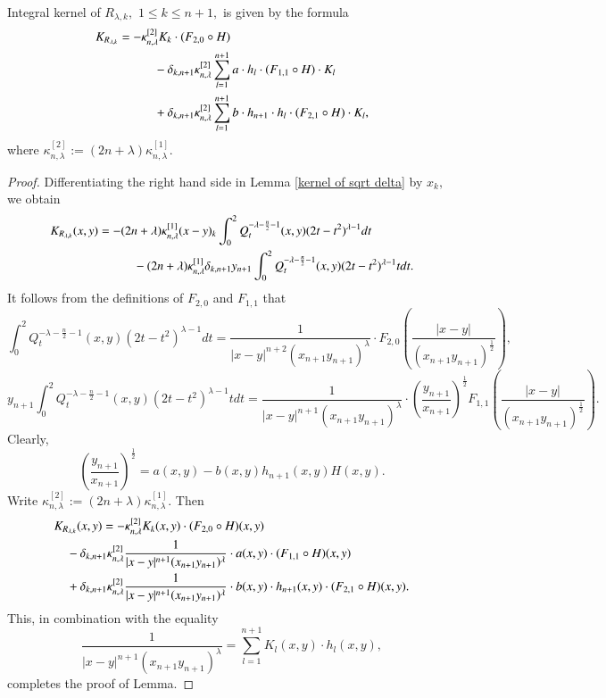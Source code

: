 \documentclass[12pt]{amsart}
\begin{document}
\begin{lemma}\label{bessel-riesz kernel representation lemma} Integral kernel of $R_{\lambda,k},$ $1\leq k\leq n+1,$ is given by the formula
\begin{align*}
K_{R_{\lambda,k}}&=-\kappa^{[2]}_{n,\lambda}K_k\cdot (F_{2,0}\circ H)\\
&\hspace{1.0cm}-\delta_{k,n+1}\kappa^{[2]}_{n,\lambda}\sum_{l=1}^{n+1}a\cdot h_l\cdot (F_{1,1}\circ H)\cdot K_l\\
&\hspace{1.0cm}+\delta_{k,n+1}\kappa^{[2]}_{n,\lambda}\sum_{l=1}^{n+1}b\cdot h_{n+1}\cdot h_l\cdot (F_{2,1}\circ H)\cdot K_l,
\end{align*}
where $\kappa^{[2]}_{n,\lambda}:=(2n+\lambda)\kappa^{[1]}_{n,\lambda}$.
\end{lemma}
\begin{proof} Differentiating the right hand side in Lemma \ref{kernel of sqrt delta} by $x_{k},$ we obtain
\begin{align*}
K_{R_{\lambda,k}}(x,y)&=-(2n+\lambda)\kappa^{[1]}_{n,\lambda}(x-y)_{k}\int_0^2Q_t^{-\lambda-\frac{n}{2}-1}(x,y)(2t-t^2)^{\lambda-1}dt\\
&\hspace{1.0cm}-(2n+\lambda)\kappa^{[1]}_{n,\lambda}\delta_{k,n+1}y_{n+1}\int_0^2Q_t^{-\lambda-\frac{n}{2}-1}(x,y)(2t-t^2)^{\lambda-1}tdt.
\end{align*}
It follows from the definitions of $F_{2,0}$ and $F_{1,1}$ that
$$\int_0^2Q_t^{-\lambda-\frac{n}{2}-1}(x,y)(2t-t^2)^{\lambda-1}dt=\frac1{|x-y|^{n+2}(x_{n+1}y_{n+1})^{\lambda}}\cdot F_{2,0}(\frac{|x-y|}{(x_{n+1}y_{n+1})^{\frac12}}),$$
$$y_{n+1}\int_0^2Q_t^{-\lambda-\frac{n}{2}-1}(x,y)(2t-t^2)^{\lambda-1}tdt=\frac1{|x-y|^{n+1}(x_{n+1}y_{n+1})^{\lambda}}\cdot (\frac{y_{n+1}}{x_{n+1}})^{\frac12}F_{1,1}(\frac{|x-y|}{(x_{n+1}y_{n+1})^{\frac12}}).$$
Clearly,
$$(\frac{y_{n+1}}{x_{n+1}})^{\frac12}=a(x,y)-b(x,y)h_{n+1}(x,y)H(x,y).$$
Write $\kappa^{[2]}_{n,\lambda}:=(2n+\lambda)\kappa^{[1]}_{n,\lambda}$. Then
\begin{align*}
K_{R_{\lambda,k}}(x,y)&=-\kappa^{[2]}_{n,\lambda}K_k(x,y)\cdot (F_{2,0}\circ H)(x,y)\\
&\hspace{-1.0cm}-\delta_{k,n+1}\kappa^{[2]}_{n,\lambda}\frac1{|x-y|^{n+1}(x_{n+1}y_{n+1})^{\lambda}}\cdot a(x,y)\cdot (F_{1,1}\circ H)(x,y)\\
&\hspace{-1.0cm}+\delta_{k,n+1}\kappa^{[2]}_{n,\lambda}\frac1{|x-y|^{n+1}(x_{n+1}y_{n+1})^{\lambda}}\cdot b(x,y)\cdot h_{n+1}(x,y)\cdot (F_{2,1}\circ H)(x,y).
\end{align*}
This, in combination with the equality
$$\frac1{|x-y|^{n+1}(x_{n+1}y_{n+1})^{\lambda}}=\sum_{l=1}^{n+1}K_l(x,y)\cdot h_l(x,y),$$
completes the proof of Lemma.
\end{proof}
\end{document}
